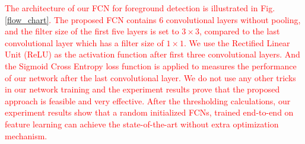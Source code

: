 \documentclass[journal]{IEEEtran}
\newcommand{\reffig}[1]{Fig. \ref{#1}}
\begin{document}
\textcolor{red}{The architecture of our FCN for foreground detection is illustrated in \reffig{flow_chart}. 
The proposed FCN contains 6 convolutional layers without pooling, and the filter size of the first five layers is set to $3\times 3$, compared to the last convolutional layer which has a filter size of $1\times 1$. 
We use the Rectified Linear Unit (ReLU) as the activation function after first three convolutional layers. And the Sigmoid Cross Entropy loss function is applied to measures the performance of our network after the last convolutional layer. 
We do not use any other tricks in our network training and the experiment results prove that the proposed approach is feasible and very effective.
After the thresholding calculations, our experiment results show that a random initialized FCNs, trained end-to-end on feature learning can achieve the state-of-the-art without extra optimization mechanism. }


% 
% 
\end{document}
